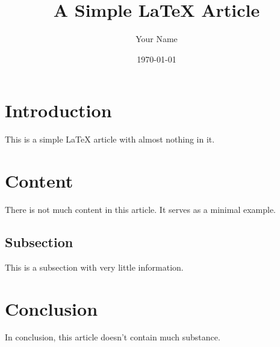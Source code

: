 \documentclass{article}
\title{A Simple LaTeX Article}
\author{Your Name}
\date{\today}
\begin{document}
\maketitle

\section{Introduction}
This is a simple LaTeX article with almost nothing in it.

\section{Content}
There is not much content in this article. It serves as a minimal example.

\subsection{Subsection}
This is a subsection with very little information.

\section{Conclusion}
In conclusion, this article doesn't contain much substance.
\end{document}
